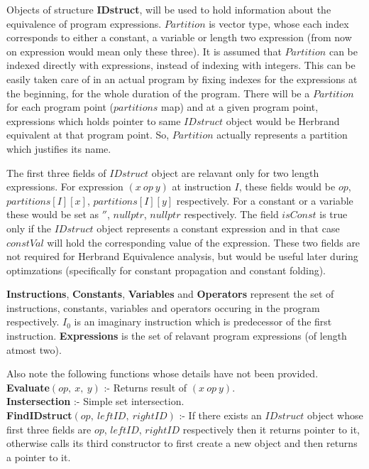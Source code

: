 Objects of structure \textbf{IDstruct}, will be used to hold information about the equivalence of program expressions. $Partition$ is vector type, whose each index corresponds to either a constant, a variable or length two expression (from now on expression would mean only these three). It is assumed that $Partition$ can be indexed directly with expressions, instead of indexing with integers. This can be easily taken care of in an actual program by fixing indexes for the expressions at the beginning, for the whole duration of the program. There will be a $Partition$ for each program point ($partitions$ map) and at a given program point, expressions which holds pointer to same $IDstruct$ object would be Herbrand equivalent at that program point. So, $Partition$ actually represents a partition which justifies its name.

The first three fields of $IDstruct$ object are relavant only for two length expressions. For expression $(x\ op\ y)$ at instruction $I$, these fields would be $op$, $partitions[I][x]$, $partitions[I][y]$ respectively. For a constant or a variable these would be set as $''$, $nullptr$, $nullptr$ respectively. The field $isConst$ is true only if the $IDstruct$ object represents a constant expression and in that case $constVal$ will hold the corresponding value of the expression. These two fields are not required for Herbrand Equivalence analysis, but would be useful later during optimzations (specifically for constant propagation and constant folding).

\textbf{Instructions}, \textbf{Constants}, \textbf{Variables} and 
\textbf{Operators} represent the set of instructions, constants, 
variables and operators occuring in the program respectively. 
$I_0$ is an imaginary instruction which is predecessor of the first 
instruction. \textbf{Expressions} is the set of relavant program 
expressions (of length atmost two).

Also note the following functions whose details have not been provided. \\
\textbf{Evaluate}$(op,\ x,\ y)$ :- Returns result of $(x\ op\ y)$. \\
\textbf{Instersection} :- Simple set intersection. \\
\textbf{FindIDstruct}$(op,\ leftID,\ rightID)$ :- If there exists an $IDstruct$ object whose first three fields are $op$, $leftID$, $rightID$ respectively then it returns pointer to it, otherwise calls its third constructor to first create a new object and then returns a pointer to it.

